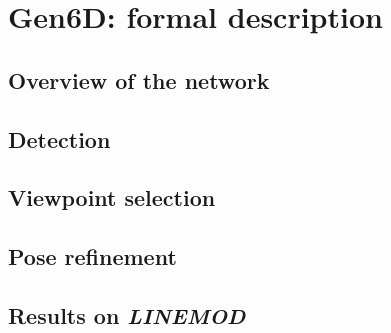 
\chapter{Gen6D: formal description}\label{chapter:gen6d_formal_description}

\section{Overview of the network}
\section{Detection}
\section{Viewpoint selection}
\section{Pose refinement}
\section{Results on \textit{LINEMOD}}